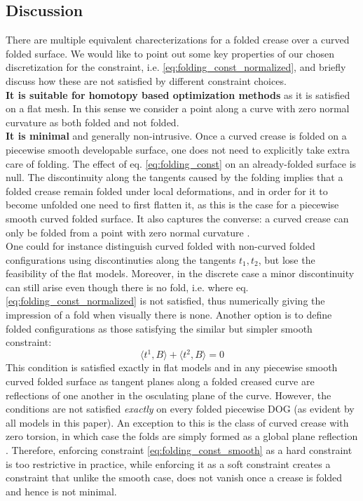 \subsection{Discussion}
There are multiple equivalent charecterizations for a folded crease over a curved folded surface. We would like to point out some key properties of our chosen discretization for the constraint, i.e. \eqref{eq:folding_const_normalized}, and briefly discuss how these are not satisfied by different constraint choices. \\
\textbf{It is suitable for homotopy based optimization methods} as it is satisfied on a flat mesh. In this sense we consider a point along a curve with zero normal curvature as both folded and not folded. \\ 
\textbf{It is minimal} and generally non-intrusive. Once a curved crease is folded on a piecewise smooth developable surface, one does not need to explicitly take extra care of folding. The effect of eq. \eqref{eq:folding_const} on an already-folded surface is null. The discontinuity along the tangents caused by the folding implies that a folded crease remain folded under local deformations, and in order for it to become unfolded one need to first flatten it, as this is the case for a piecewise smooth curved folded surface. It also captures the converse: a curved crease can only be folded from a point with zero normal curvature \cite{more_on_paper}. \\
One could for instance distinguish curved folded with non-curved folded configurations using discontinuties along the tangents $t_1,t_2$, but lose the feasibility of the flat models. Moreover, in the discrete case a minor discontinuity can still arise even though there is no fold, i.e. where eq. \eqref{eq:folding_const_normalized} is not satisfied, thus numerically giving the impression of a fold when visually there is none. Another option is to define folded configurations as those satisfying the similar but simpler smooth constraint:
\begin{equation} \label{eq:folding_const_smooth} 
\langle t^1,B\rangle + \langle t^2,B\rangle = 0
\end{equation}
This condition is satisfied exactly in flat models and in any piecewise smooth curved folded surface as tangent planes along a folded creased curve are reflections of one another in the osculating plane of the curve. However, the conditions are not satisfied \emph{exactly} on every folded piecewise DOG (as evident by all models in this paper). An exception to this is the class of curved crease with zero torsion, in which case the folds are simply formed as a global plane reflection \cite{Mitani_ref}. Therefore, enforcing constraint \eqref{eq:folding_const_smooth} as a hard constraint is too restrictive in practice, while enforcing it as a soft constraint creates a constraint that unlike the smooth case, does not vanish once a crease is folded and hence is not minimal.

